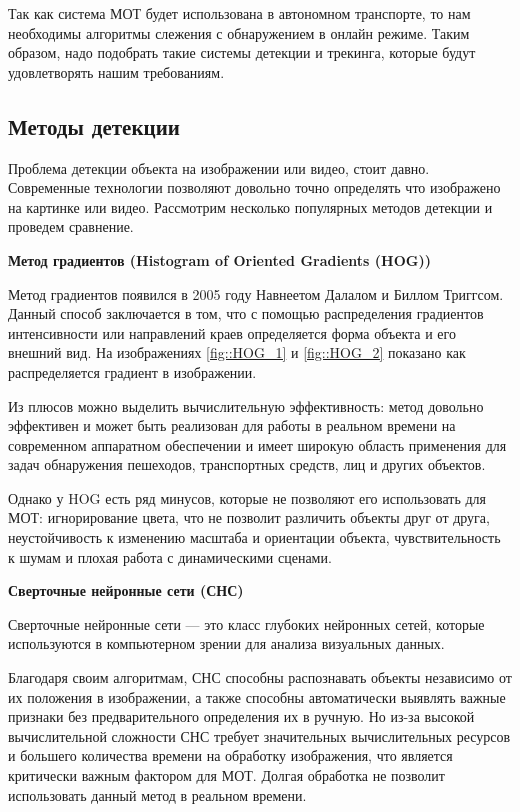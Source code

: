 Так как система МОТ будет использована в автономном транспорте, то нам необходимы алгоритмы слежения с обнаружением в онлайн режиме. Таким образом, надо подобрать такие системы детекции и трекинга, которые будут удовлетворять нашим требованиям.

\subsection{Методы детекции}

Проблема детекции объекта на изображении или видео, стоит давно. Современные технологии позволяют довольно точно определять что изображено на картинке или видео. Рассмотрим несколько популярных методов детекции и проведем сравнение.

\textbf{Метод градиентов (Histogram of Oriented Gradients (HOG))}

Метод градиентов появился в 2005 году Навнеетом Далалом и Биллом Триггсом. Данный способ заключается в том, что с помощью распределения градиентов интенсивности или направлений краев определяется форма объекта и его внешний вид. На изображениях \ref{fig::HOG_1} и \ref{fig::HOG_2} показано как распределяется градиент в изображении.


Из плюсов можно выделить вычислительную эффективность: метод довольно эффективен и может быть реализован для работы в реальном времени на современном аппаратном обеспечении и имеет широкую область применения для задач обнаружения пешеходов, транспортных средств, лиц и других объектов. 


Однако у HOG есть ряд минусов, которые не позволяют его использовать для МОТ: игнорирование цвета, что не позволит различить объекты друг от друга, неустойчивость к изменению масштаба и ориентации объекта, чувствительность к шумам и плохая работа с динамическими сценами.  

\textbf{Сверточные нейронные сети (СНС)}

Сверточные нейронные сети --- это класс глубоких нейронных сетей, которые используются в компьютерном зрении для анализа визуальных данных. 

Благодаря своим алгоритмам, СНС способны распознавать объекты независимо от их положения в изображении, а также способны автоматически выявлять важные признаки без предварительного определения их в ручную. Но из-за высокой вычислительной сложности СНС требует значительных вычислительных ресурсов и большего количества времени на обработку изображения, что является критически важным фактором для МОТ. Долгая обработка не позволит использовать данный метод в реальном времени.

